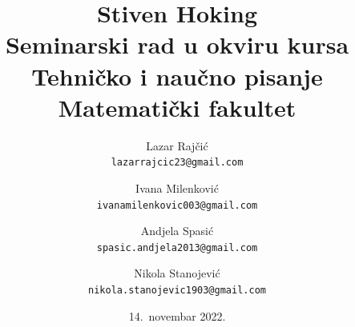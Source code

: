 \documentclass[a4paper, 12pt]{article}
\begin{document}
\title{Stiven Hoking\\ \small{Seminarski rad u okviru kursa\\Tehničko i naučno pisanje\\ Matematički fakultet}}

\author{
 Lazar Rajčić\\
  \texttt{lazarrajcic23@gmail.com}
  \and
  Ivana Milenković\\
  \texttt{ivanamilenkovic003@gmail.com}
  \and
Andjela Spasić\\
  \texttt{spasic.andjela2013@gmail.com}
  \and
Nikola Stanojević\\
  \texttt{nikola.stanojevic1903@gmail.com}
}
\date{14.~novembar 2022.}
\maketitle
\end{document}
